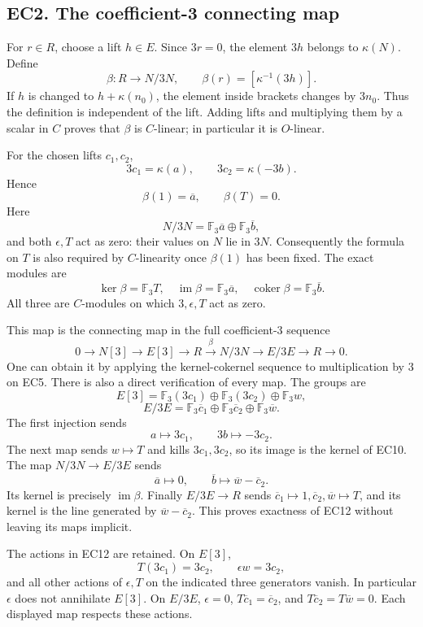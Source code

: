 \documentclass[
  10pt,
  a4paper,
]{article}
\begin{document}
\subsection{EC2. The coefficient-3 connecting
map}\label{ec2.-the-coefficient-3-connecting-map}

For \(r\in R\), choose a lift \(h\in E\). Since \(3r=0\), the element
\(3h\) belongs to \(\kappa(N)\). Define \[
\beta:R\longrightarrow N/3N,\qquad
\beta(r)=[\kappa^{-1}(3h)].
\tag{EC9}
\] If \(h\) is changed to \(h+\kappa(n_0)\), the element inside brackets
changes by \(3n_0\). Thus the definition is independent of the lift.
Adding lifts and multiplying them by a scalar in \(C\) proves that
\(\beta\) is \(C\)-linear; in particular it is \(O\)-linear.

For the chosen lifts \(c_1,c_2\), \[
3c_1=\kappa(a),\qquad 3c_2=\kappa(-3b).
\] Hence \[
\boxed{\beta(1)=\overline a,\qquad\beta(T)=0.}
\tag{EC10}
\] Here \[
N/3N=\mathbb F_3\overline a\oplus\mathbb F_3\overline b,
\] and both \(\epsilon,T\) act as zero: their values on \(N\) lie in
\(3N\). Consequently the formula on \(T\) is also required by
\(C\)-linearity once \(\beta(1)\) has been fixed. The exact modules are
\[
\ker\beta=\mathbb F_3T,\quad
\operatorname{im}\beta=\mathbb F_3\overline a,\quad
\operatorname{coker}\beta=\mathbb F_3\overline b.
\tag{EC11}
\] All three are \(C\)-modules on which \(3,\epsilon,T\) act as zero.

This map is the connecting map in the full coefficient-3 sequence \[
0\to N[3]\to E[3]\to R
\xrightarrow{\beta}N/3N\to E/3E\to R\to0.
\tag{EC12}
\] One can obtain it by applying the kernel-cokernel sequence to
multiplication by 3 on EC5. There is also a direct verification of every
map. The groups are \[
E[3]=\mathbb F_3(3c_1)\oplus\mathbb F_3(3c_2)\oplus\mathbb F_3w,
\] \[
E/3E=\mathbb F_3\overline c_1\oplus
\mathbb F_3\overline c_2\oplus\mathbb F_3\overline w.
\] The first injection sends \[
a\mapsto3c_1,\qquad3b\mapsto-3c_2.
\] The next map sends \(w\mapsto T\) and kills \(3c_1,3c_2\), so its
image is the kernel of EC10. The map \(N/3N\to E/3E\) sends \[
\overline a\mapsto0,\qquad
\overline b\mapsto\overline w-\overline c_2.
\] Its kernel is precisely \(\operatorname{im}\beta\). Finally
\(E/3E\to R\) sends
\(\overline c_1\mapsto1,\overline c_2,\overline w\mapsto T\), and its
kernel is the line generated by \(\overline w-\overline c_2\). This
proves exactness of EC12 without leaving its maps implicit.

The actions in EC12 are retained. On \(E[3]\), \[
T(3c_1)=3c_2,\qquad\epsilon w=3c_2,
\] and all other actions of \(\epsilon,T\) on the indicated three
generators vanish. In particular \(\epsilon\) does not annihilate
\(E[3]\). On \(E/3E\), \(\epsilon=0\), \(T\overline c_1=\overline c_2\),
and \(T\overline c_2=T\overline w=0\). Each displayed map respects these
actions.
\end{document}
